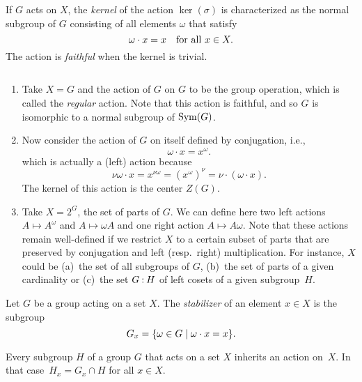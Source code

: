 \begin{defn}
    If\/ $G$ acts on $X$, the \textsl{kernel} of the action $\ker(\sigma)$ is characterized as the normal subgroup of\/ $G$ consisting of all elements $\omega$ that satisfy
    $$
        \omega\cdot x=x\quad\textrm{\rm for all }x\in X.
    $$
    The action is \textsl{faithful} when the kernel is trivial.
\end{defn}

\begin{xmpls}${}$
\begin{enumerate}[\rm 1.]
    \item Take $X=G$ and the action of\/ $G$ on $G$ to be the group operation, which is called the \textsl{regular} action. Note that this action is faithful, and so\/ $G$ is isomorphic to a normal subgroup of\/ ${\rm Sym}(G)$.

    \item Now consider the action of\/ $G$ on itself defined by conjugation, i.e., 
    $$
        \omega\cdot x= x^\omega.
    $$
    which is actually a (left) action because
    $$
        \nu\omega\cdot x=x^{\nu\omega}=(x^\omega)^\nu=\nu\cdot(\omega\cdot x).
    $$
    The kernel of this action is the center $Z(G)$.

    \item Take $X=2^G$, the set of parts of $G$. We can define here two left actions $A\mapsto A^\omega$ and $A\mapsto\omega A$ and one right action $A\mapsto A\omega$. Note that these actions remain well-defined if we restrict $X$ to a certain subset of parts that are preserved by conjugation and left (resp.~right) multiplication. For instance, $X$ could be {\rm(a)}~the set of all subgroups of\/ $G$, {\rm(b)}~the set of parts of a given cardinality or {\rm(c)}~the set $G\mathbin:H$ of left cosets of a given subgroup~$H$.
\end{enumerate}
\end{xmpls}

\begin{defn}
    Let $G$ be a group acting on a set $X$. The \textsl{stabilizer} of an element $x\in X$ is the subgroup
    $$
        G_x = \{\omega\in G\mid \omega\cdot x=x\}.
    $$
\end{defn}

\begin{rem}
    Every subgroup\/ $H$ of a group $G$ that acts on a set $X$ inherits an action on~$X$. In that case~$H_x=G_x\cap H$ for all $x\in X$.
\end{rem}

